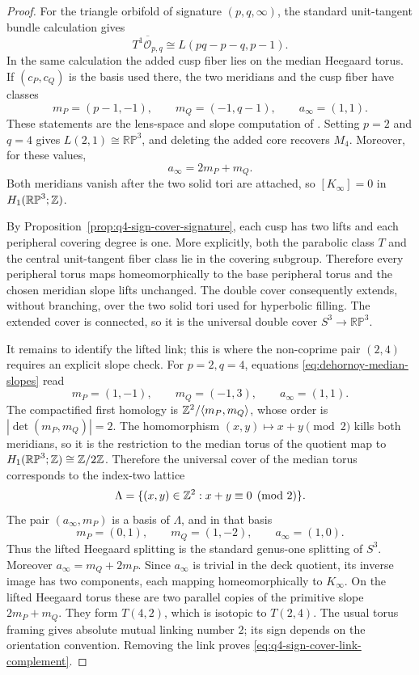 \begin{proof}
For the triangle orbifold of signature \((p,q,\infty)\), the standard unit-tangent
bundle calculation gives
\begin{equation}
 \overline{T^1\mathcal O_{p,q}}
 \cong L(pq-p-q,p-1).
 \label{eq:dehornoy-lens-compactification}
\end{equation}
In the same calculation the added cusp fiber lies on the median Heegaard torus.
If \((c_P,c_Q)\) is the basis used there, the two meridians and the cusp fiber
have classes
\begin{equation}
 m_P=(p-1,-1),
 \qquad
 m_Q=(-1,q-1),
 \qquad
 a_\infty=(1,1).
 \label{eq:dehornoy-median-slopes}
\end{equation}
These statements are the lens-space and slope computation of
\cite[Lemmas~5.2 and~5.3]{Dehornoy2015GeodesicFlow}.  Setting \(p=2\) and \(q=4\)
gives
\(L(2,1)\cong\mathbb {RP}^3\), and deleting the added core recovers \(M_4\).
Moreover, for these values,
\[
 a_\infty=2m_P+m_Q.
\]
Both meridians vanish after the two solid tori are attached, so
\([K_\infty]=0\) in \(H_1(\mathbb {RP}^3;\mathbb{Z})\).

By Proposition~\ref{prop:q4-sign-cover-signature}, each cusp has two lifts and
each peripheral covering degree is one.  More explicitly, both the parabolic
class \(T\) and the central unit-tangent fiber class lie in the covering
subgroup.  Therefore every peripheral torus maps homeomorphically to the base
peripheral torus and the chosen meridian slope lifts unchanged.  The double
cover consequently extends, without branching, over the two solid tori used
for hyperbolic filling.  The extended cover is connected, so it is the universal double cover
\(S^3\to\mathbb {RP}^3\).

It remains to identify the lifted link; this is where the non-coprime pair
\((2,4)\) requires an explicit slope check.  For \(p=2,q=4\), equations
\eqref{eq:dehornoy-median-slopes} read
\[
 m_P=(1,-1),
 \qquad m_Q=(-1,3),
 \qquad a_\infty=(1,1).
\]
The compactified first homology is
$\mathbb{Z}^2/\langle m_P,m_Q\rangle$, whose order is
\(|\det(m_P,m_Q)|=2\).  The homomorphism
\((x,y)\mapsto x+y\pmod 2\) kills both meridians, so it is the restriction to
the median torus of the quotient map to
\(H_1(\mathbb {RP}^3;\mathbb{Z})\cong\mathbb{Z}/2\mathbb{Z}\).  Therefore the universal cover of the
median torus corresponds to the index-two lattice
\[
 \Lambda=\{(x,y)\in\mathbb{Z}^2:x+y\equiv0\pmod2\}.
\]
The pair \((a_\infty,m_P)\) is a basis of \(\Lambda\), and in that basis
\[
 m_P=(0,1),
 \qquad
 m_Q=(1,-2),
 \qquad
 a_\infty=(1,0).
\]
Thus the lifted Heegaard splitting is the standard genus-one splitting of \(S^3\).
Moreover \(a_\infty=m_Q+2m_P\).  Since \(a_\infty\) is trivial in the deck
quotient, its inverse image has two components, each mapping homeomorphically
to \(K_\infty\).  On the lifted Heegaard torus these are two parallel copies of
the primitive slope \(2m_P+m_Q\).  They form \(T(4,2)\), which is isotopic to
\(T(2,4)\).  The usual torus framing gives absolute mutual linking number \(2\);
its sign depends on the orientation convention.
Removing the link proves \eqref{eq:q4-sign-cover-link-complement}.
\end{proof}

